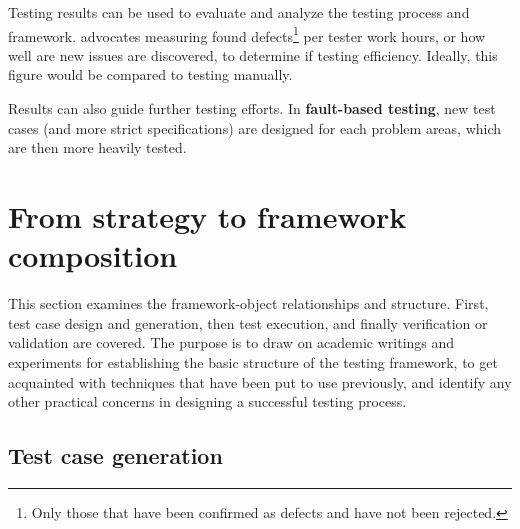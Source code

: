 \documentclass[12pt,a4paper,oneside,pdftex]{report}
\begin{document}
Testing results can be used to evaluate and analyze the testing process and framework. \citet{jenkins2008software} advocates measuring found defects\footnote{Only those that have been confirmed as defects and have not been rejected.} per tester work hours, or how well are new issues are discovered, to determine if testing efficiency. Ideally, this figure would be compared to testing manually. 

Results can also guide further testing efforts. In \textbf{fault-based testing}, new test cases (and more strict specifications) are designed for each problem areas, which are then more heavily tested. \citep{pezze2008software}

\begin{comment}
Once the test cases have been created and chosen, the test set quality itself can be evaluated quantitatively and 'tested', too. For example, in \citeauthor{delamaro2001interface}'s \citeyearpar{delamaro2001interface} \emph{mutation testing} the test set quality is evaluated by creating variations of the tested programs and running the cases against the mutated programs. If it succeeds against the mutated program, the case is considered live. Ideally, cases will fail when run against modified, 'erroneous' code. 
\end{comment}
%
%

\section{From strategy to framework composition}

This section examines the framework-object relationships and structure. First, test case design and generation, then test execution, and finally verification or validation are covered. The purpose is to draw on academic writings and experiments for establishing the basic structure of the testing framework, to get acquainted with techniques that have been put to use previously, and identify any other practical concerns in designing a successful testing process.

\subsection{Test case generation}
\end{document}
